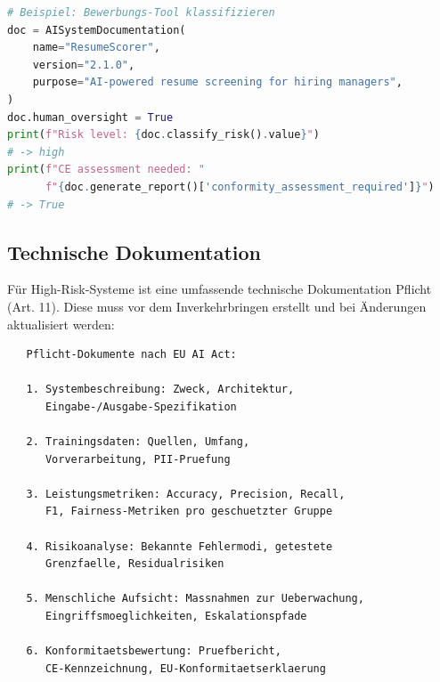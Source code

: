 \begin{lstlisting}[language=Python, caption=EU-AI-Act-Risikoklassifikation und Dokumentation]
# Beispiel: Bewerbungs-Tool klassifizieren
doc = AISystemDocumentation(
    name="ResumeScorer",
    version="2.1.0",
    purpose="AI-powered resume screening for hiring managers",
)
doc.human_oversight = True
print(f"Risk level: {doc.classify_risk().value}")
# -> high
print(f"CE assessment needed: "
      f"{doc.generate_report()['conformity_assessment_required']}")
# -> True
\end{lstlisting}

\subsection{Technische Dokumentation}

Für High-Risk-Systeme ist eine umfassende technische Dokumentation Pflicht (Art. 11). Diese muss vor dem Inverkehrbringen erstellt und bei Änderungen aktualisiert werden:

\begin{verbatim}
   Pflicht-Dokumente nach EU AI Act:
   
   1. Systembeschreibung: Zweck, Architektur,
      Eingabe-/Ausgabe-Spezifikation
   
   2. Trainingsdaten: Quellen, Umfang,
      Vorverarbeitung, PII-Pruefung
   
   3. Leistungsmetriken: Accuracy, Precision, Recall,
      F1, Fairness-Metriken pro geschuetzter Gruppe
   
   4. Risikoanalyse: Bekannte Fehlermodi, getestete
      Grenzfaelle, Residualrisiken
   
   5. Menschliche Aufsicht: Massnahmen zur Ueberwachung,
      Eingriffsmoeglichkeiten, Eskalationspfade
   
   6. Konformitaetsbewertung: Pruefbericht,
      CE-Kennzeichnung, EU-Konformitaetserklaerung
\end{verbatim}

